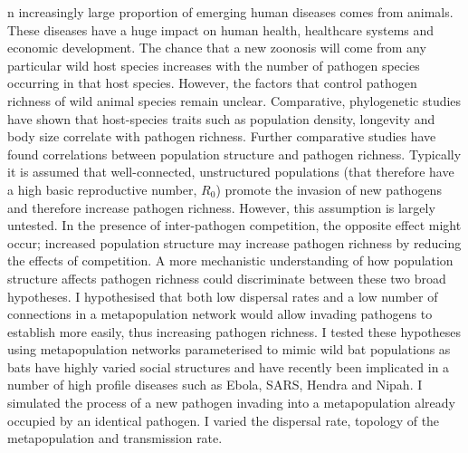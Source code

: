 n increasingly large proportion of emerging human diseases comes from animals.
These diseases have a huge impact on human health, healthcare systems and economic development.
The chance that a new zoonosis will come from any particular wild host species increases with the number of pathogen species occurring in that host species.
However, the factors that control pathogen richness of wild animal species remain unclear.
%
%
Comparative, phylogenetic studies have shown that host-species traits such as population density, longevity and body size correlate with pathogen richness.
Further comparative studies have found correlations between population structure and pathogen richness.
Typically it is assumed that well-connected, unstructured populations (that therefore have a high basic reproductive number, $R_0$) promote the invasion of new pathogens and therefore increase pathogen richness. %
However, this assumption is largely untested.
In the presence of inter-pathogen competition, the opposite effect might occur; increased population structure may increase pathogen richness by reducing the effects of competition.
A more mechanistic understanding of how population structure affects pathogen richness could discriminate between these two broad hypotheses.
%
I hypothesised that both low dispersal rates and a low number of connections in a metapopulation network would allow invading pathogens to establish more easily, thus increasing pathogen richness. 
I tested these hypotheses using metapopulation networks parameterised to mimic wild bat populations as bats have highly varied social structures and have recently been implicated in a number of high profile diseases such as Ebola, SARS, Hendra and Nipah.
%
%
I simulated the process of a new pathogen invading into a metapopulation already occupied by an identical pathogen.
I varied the dispersal rate, topology of the metapopulation and transmission rate.
